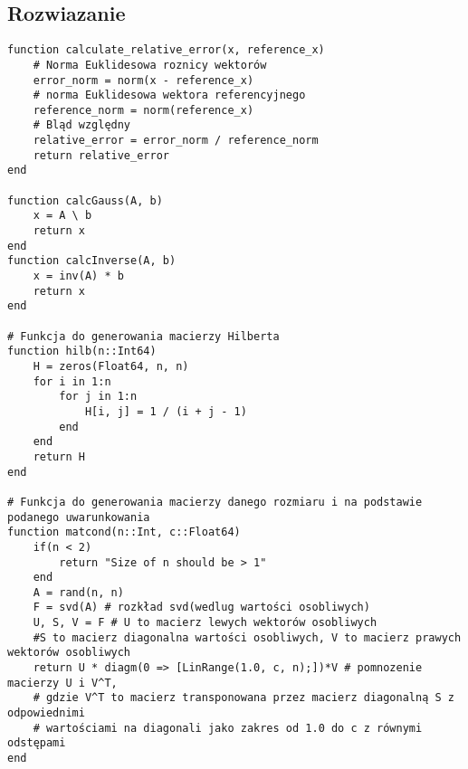 \documentclass{article}
\begin{document}
\subsection{Rozwiazanie}
\begin{verbatim}
function calculate_relative_error(x, reference_x)
    # Norma Euklidesowa roznicy wektorów
    error_norm = norm(x - reference_x) 
    # norma Euklidesowa wektora referencyjnego
    reference_norm = norm(reference_x)
    # Bląd względny
    relative_error = error_norm / reference_norm
    return relative_error
end

function calcGauss(A, b) 
    x = A \ b
    return x
end
function calcInverse(A, b)
    x = inv(A) * b
    return x
end

# Funkcja do generowania macierzy Hilberta
function hilb(n::Int64)
    H = zeros(Float64, n, n)
    for i in 1:n 
        for j in 1:n
            H[i, j] = 1 / (i + j - 1)
        end
    end
    return H
end

# Funkcja do generowania macierzy danego rozmiaru i na podstawie podanego uwarunkowania
function matcond(n::Int, c::Float64)
    if(n < 2)
        return "Size of n should be > 1"
    end
    A = rand(n, n)
    F = svd(A) # rozkład svd(wedlug wartości osobliwych)
    U, S, V = F # U to macierz lewych wektorów osobliwych
    #S to macierz diagonalna wartości osobliwych, V to macierz prawych wektorów osobliwych
    return U * diagm(0 => [LinRange(1.0, c, n);])*V # pomnozenie macierzy U i V^T, 
    # gdzie V^T to macierz transponowana przez macierz diagonalną S z odpowiednimi 
    # wartościami na diagonali jako zakres od 1.0 do c z równymi odstępami
end
\end{verbatim}
\end{document}
